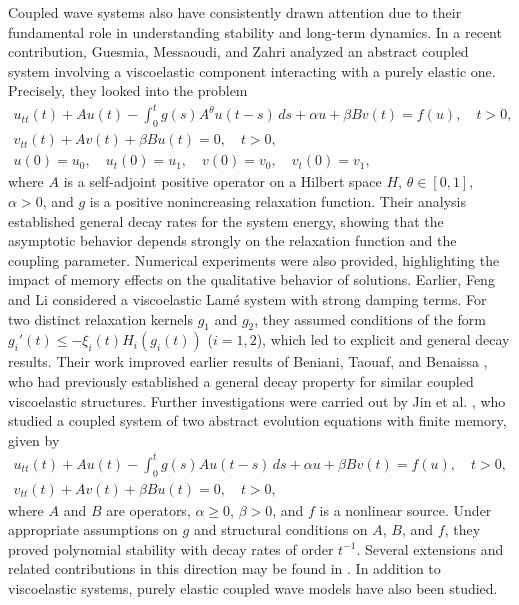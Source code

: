 \documentclass[reqno]{amsart}
\begin{document}
Coupled wave systems also have consistently drawn attention due to their fundamental role in understanding stability and long-term dynamics. In a recent contribution, Guesmia, Messaoudi, and Zahri \cite{GASM} analyzed an abstract coupled system involving a viscoelastic component interacting with a purely elastic one. Precisely, they looked into the problem
\begin{gather*}
u_{tt}(t) + Au(t) - \int_0^{t} g(s) A^{\theta} u(t - s) \, ds + \alpha u + \beta B v(t) = f(u), \quad t > 0, \\
v_{tt}(t) + A v(t) + \beta B u(t) = 0, \quad t > 0,\\
u(0) = u_0, \quad u_t(0) = u_1, \quad v(0) = v_0, \quad v_t(0) = v_1,
\end{gather*}
 where $A$ is a self-adjoint positive operator on a Hilbert space $H$, $\theta \in [0,1]$,
 $\alpha > 0$, and $g$ is a positive nonincreasing relaxation function.
 Their analysis established general decay rates for the system energy, showing that the
 asymptotic behavior depends strongly on the relaxation function and the coupling parameter.
 Numerical experiments were also provided, highlighting the impact of memory effects on
 the qualitative behavior of solutions. Earlier, Feng and Li \cite{FengBaoweiHaiyan} considered
 a viscoelastic Lam\'e system with strong damping terms. For two distinct relaxation kernels
 $g_1$ and $g_2$, they assumed conditions of the form $g_i'(t) \leq -\xi_i(t) H_i(g_i(t))$
 ($i=1,2$), which led to explicit and general decay results. Their work improved earlier results
 of Beniani, Taouaf, and Benaissa \cite{Beniani}, who had previously established a general
 decay property for similar coupled viscoelastic structures.
Further investigations were carried out by Jin et al. \cite{JKJT}, who studied a coupled system of two abstract evolution equations with finite memory, given by
\begin{gather*}
 u_{tt}(t) + Au(t) - \int_0^{t} g(s) A u(t - s) \, ds + \alpha u + \beta B v(t)
 = f(u), \quad t > 0, \\
v_{tt}(t) + A v(t) + \beta B u(t) = 0, \quad t > 0,
 \end{gather*}
 where $A$ and $B$ are operators, $\alpha \geq 0$, $\beta > 0$, and $f$ is a nonlinear source.
 Under appropriate assumptions on $g$ and structural conditions on $A$, $B$, and $f$,
 they proved polynomial stability with decay rates of order $t^{-1}$. Several extensions and
related contributions in this direction may be found in \cite{ ORHC, AkilM}.
In addition to viscoelastic systems, purely elastic coupled wave models have also been studied.
\end{document}

